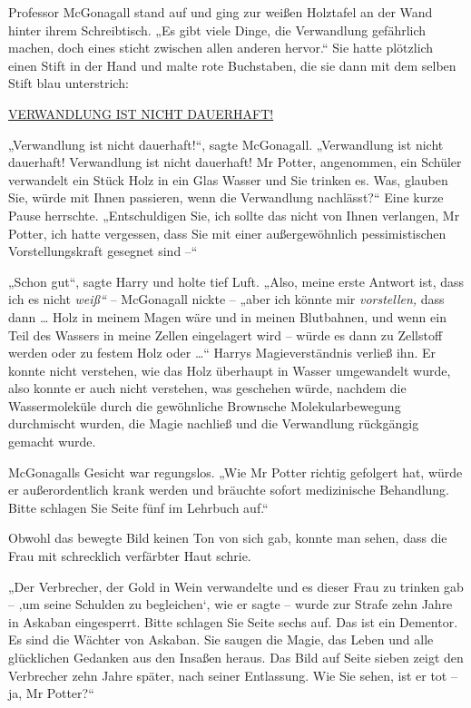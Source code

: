 {Professor McGonagall stand auf und ging zur weißen Holztafel an der Wand hinter ihrem Schreibtisch. „Es gibt viele Dinge, die Verwandlung gefährlich machen, doch eines sticht zwischen allen anderen hervor.“ Sie hatte plötzlich einen Stift in der Hand und malte rote Buchstaben, die sie dann mit dem selben Stift blau unterstrich:

\uline{VERWANDLUNG IST NICHT DAUERHAFT!}

„Verwandlung ist nicht dauerhaft!“, sagte McGonagall. „Verwandlung ist nicht dauerhaft! Verwandlung ist nicht dauerhaft! Mr Potter, angenommen, ein Schüler verwandelt ein Stück Holz in ein Glas Wasser und Sie trinken es. Was, glauben Sie, würde mit Ihnen passieren, wenn die Verwandlung nachlässt?“ Eine kurze Pause herrschte. „Entschuldigen Sie, ich sollte das nicht von Ihnen verlangen, Mr Potter, ich hatte vergessen, dass Sie mit einer außergewöhnlich pessimistischen Vorstellungskraft gesegnet sind --“

„Schon gut“, sagte Harry und holte tief Luft. „Also, meine erste Antwort ist, dass ich es nicht \emph{weiß“} -- McGonagall nickte -- „aber ich könnte mir \emph{vorstellen,} dass dann … Holz in meinem Magen wäre und in meinen Blutbahnen, und wenn ein Teil des Wassers in meine Zellen eingelagert wird -- würde es dann zu Zellstoff werden oder zu festem Holz oder …“ Harrys Magieverständnis verließ ihn. Er konnte nicht verstehen, wie das Holz überhaupt in Wasser umgewandelt wurde, also konnte er auch nicht verstehen, was geschehen würde, nachdem die Wassermoleküle durch die gewöhnliche Brownsche Molekularbewegung durchmischt wurden, die Magie nachließ und die Verwandlung rückgängig gemacht wurde.

McGonagalls Gesicht war regungslos. „Wie Mr Potter richtig gefolgert hat, würde er außerordentlich krank werden und bräuchte sofort medizinische Behandlung. Bitte schlagen Sie Seite fünf im Lehrbuch auf.“

Obwohl das bewegte Bild keinen Ton von sich gab, konnte man sehen, dass die Frau mit schrecklich verfärbter Haut schrie.

„Der Verbrecher, der Gold in Wein verwandelte und es dieser Frau zu trinken gab -- ‚um seine Schulden zu begleichen`, wie er sagte -- wurde zur Strafe zehn Jahre in Askaban eingesperrt. Bitte schlagen Sie Seite sechs auf. Das ist ein Dementor. Es sind die Wächter von Askaban. Sie saugen die Magie, das Leben und alle glücklichen Gedanken aus den Insaßen heraus. Das Bild auf Seite sieben zeigt den Verbrecher zehn Jahre später, nach seiner Entlassung. Wie Sie sehen, ist er tot -- ja, Mr Potter?“

}
